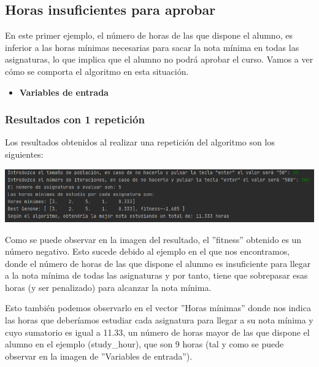 \documentclass[11pt, a4paper, titlepage]{article}
\begin{document}
\subsection{Horas insuficientes para aprobar}
En este primer ejemplo, el número de horas de las que dispone el alumno, es inferior a las horas mínimas necesarias para sacar la nota mínima en todas las asignaturas, lo que implica que el alumno no podrá aprobar el curso. Vamos a ver cómo se comporta el algoritmo en esta situación.

\vspace{5mm}

\begin{itemize}
\item \textbf{Variables de entrada}
\end{itemize}


\subsubsection{Resultados con 1 repetición}
Los resultados obtenidos al realizar una repetición del algoritmo son los siguientes:

\vspace{5mm}

\includegraphics[scale=0.7]{img/Res1_horas_insuf.png}

\vspace{5mm}

Como se puede observar en la imagen del resultado, el ''fitness'' obtenido es un número negativo. Esto sucede debido al ejemplo en el que nos encontramos, donde el número de horas de las que dispone el alumno es insuficiente para llegar a la nota mínima de todas las asignaturas y por tanto, tiene que sobrepasar esas horas (y ser penalizado) para alcanzar la nota mínima.

\vspace{5mm}

Esto también podemos observarlo en el vector ''Horas mínimas'' donde nos indica las horas que deberíamos estudiar cada asignatura para llegar a su nota mínima y cuyo sumatorio es igual a 11.33, un número de horas mayor de las que dispone el alumno en el ejemplo (study\_hour), que son 9 horas (tal y como se puede observar en la imagen de ''Variables de entrada'').
\end{document}
